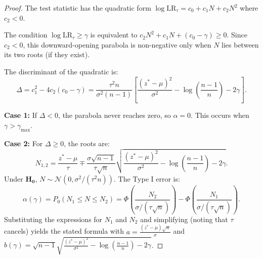 \documentclass{article}
\theoremstyle{plain}
\theoremstyle{definition}
\theoremstyle{remark}
\renewcommand{\leq}{\leqslant}
\renewcommand{\geq}{\geqslant}
\begin{document}
\begin{proof}
    The test statistic has the quadratic form $\log \mathrm{LR}_\tau = c_0 + c_1 N + c_2 N^2$ where $c_2 < 0$.

    The condition $\log \mathrm{LR}_\tau \geq \gamma$ is equivalent to $c_2 N^2 + c_1 N + (c_0 - \gamma) \geq 0$. Since $c_2 < 0$, this downward-opening parabola is non-negative only when $N$ lies between its two roots (if they exist).

    The discriminant of the quadratic is:
    \begin{equation*}
        \Delta = c_1^2 - 4c_2(c_0 - \gamma) = \frac{\tau^2 n}{\sigma^2(n-1)}\left[\frac{(z^* - \mu)^2}{\sigma^2} - \log\left(\frac{n-1}{n}\right) - 2\gamma\right].
    \end{equation*}

    \textbf{Case 1:} If $\Delta < 0$, the parabola never reaches zero, so $\alpha = 0$. This occurs when $\gamma > \gamma_{\max}$.

    \textbf{Case 2:} For $\Delta \geq 0$, the roots are:
    \begin{equation*}
        N_{1,2} = \frac{z^* - \mu}{\tau} \mp \frac{\sigma\sqrt{n-1}}{\tau\sqrt{n}}\sqrt{\frac{(z^* - \mu)^2}{\sigma^2} - \log\left(\frac{n-1}{n}\right) - 2\gamma}.
    \end{equation*}
    Under $\mathbf{H_0}$, $N \sim \mathcal{N}(0, \sigma^2/(\tau^2 n))$. The Type I error is:
    \begin{equation*}
        \alpha(\gamma) = P_0(N_1 \leq N \leq N_2) = \Phi\left(\frac{N_2}{\sigma/(\tau\sqrt{n})}\right) - \Phi\left(\frac{N_1}{\sigma/(\tau\sqrt{n})}\right).
    \end{equation*}
    Substituting the expressions for $N_1$ and $N_2$ and simplifying (noting that $\tau$ cancels) yields the stated formula with $a = \frac{(z^* - \mu)\sqrt{n}}{\sigma}$ and $b(\gamma) = \sqrt{n-1}\sqrt{\frac{(z^* - \mu)^2}{\sigma^2} - \log\left(\frac{n-1}{n}\right) - 2\gamma}$.


\end{proof}
\end{document}
